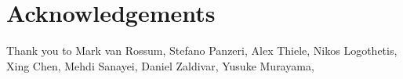 

\begingroup

\let\clearpage\relax
\let\cleardoublepage\relax
\let\cleardoublepage\relax

\chapter*{Acknowledgements} %

Thank you to
Mark van Rossum,
Stefano Panzeri,
Alex Thiele,
Nikos Logothetis,
Xing Chen,
Mehdi Sanayei,
Daniel Zaldivar,
Yusuke Murayama,

\endgroup
